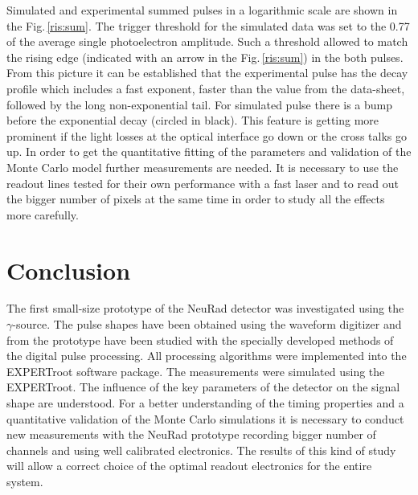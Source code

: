 \documentclass{webofc}
\newcommand{\er}{\textmd{EXPERTroot}}
\begin{document}
Simulated and experimental summed pulses in a logarithmic scale are shown in the Fig.\,\ref{ris:sum}.
The trigger threshold for the simulated data was set to the 0.77 of the average single photoelectron amplitude.
Such a threshold allowed to match the rising edge (indicated with an arrow in the Fig.\,\ref{ris:sum}) in the both pulses. From this picture it can be established that the experimental pulse has the decay profile which includes a fast exponent, faster than the value from the data-sheet, followed by the long non-exponential tail. For simulated pulse there is a bump before the exponential decay (circled in black). This feature is getting more prominent if the light losses at the optical interface go down or the cross talks go up. In order to get the quantitative fitting of the parameters and validation of the Monte Carlo model further measurements are needed. It is necessary to use the readout lines tested for their own performance with a fast laser and to read out the bigger number of pixels at the same time in order to study all the effects more carefully.

\section{Conclusion}
		
	The first small-size prototype of the NeuRad detector was investigated using the $\gamma$-source. The pulse shapes have been obtained using the waveform digitizer and from the prototype have been studied with the specially developed methods of the digital pulse processing. All processing algorithms were implemented into the EXPERTroot software package. The measurements were simulated using the \er. The influence of the key parameters of the detector on the signal shape are understood. For a better understanding of the timing properties and a quantitative validation of the Monte Carlo simulations it is necessary to conduct new measurements with the NeuRad prototype recording bigger number of channels and using well calibrated electronics.
	The results of this kind of study will allow a correct choice of the optimal readout electronics for the entire system.
	
	
	
\end{document}
